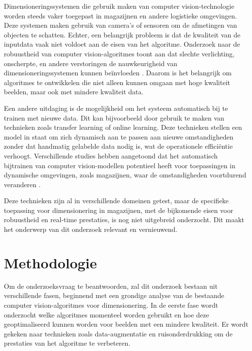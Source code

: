 Dimensioneringssystemen die gebruik maken van computer vision-technologie worden steeds vaker toegepast in magazijnen en andere logistieke omgevingen. Deze systemen maken gebruik van camera’s of sensoren om de afmetingen van objecten te schatten. \autocite{getcameras2024} Echter, een belangrijk probleem is dat de kwaliteit van de inputdata vaak niet voldoet aan de eisen van het algoritme. Onderzoek naar de robuustheid van computer vision-algoritmes toont aan dat slechte verlichting, onscherpte, en andere verstoringen de nauwkeurigheid van dimensioneringssystemen kunnen beïnvloeden \autocite{DeepCorrect2024}. Daarom is het belangrijk om algoritmes te ontwikkelen die niet alleen kunnen omgaan met hoge kwaliteit beelden, maar ook met mindere kwaliteit data.

Een andere uitdaging is de mogelijkheid om het systeem automatisch bij te trainen met nieuwe data. Dit kan bijvoorbeeld door gebruik te maken van technieken zoals transfer learning of online learning. Deze technieken stellen een model in staat om zich dynamisch aan te passen aan nieuwe omstandigheden zonder dat handmatig gelabelde data nodig is, wat de operationele efficiëntie verhoogt. Verschillende studies hebben aangetoond dat het automatisch bijtrainen van computer vision-modellen potentieel heeft voor toepassingen in dynamische omgevingen, zoals magazijnen, waar de omstandigheden voortdurend veranderen \autocite{AdaptLearn2024} \autocite{MDPI2024}.

Deze technieken zijn al in verschillende domeinen getest, maar de specifieke toepassing voor dimensionering in magazijnen, met de bijkomende eisen voor robuustheid en real-time prestaties, is nog niet uitgebreid onderzocht. Dit maakt het onderwerp van dit onderzoek relevant en vernieuwend.


\section{Methodologie}
\label{sec:methodologie}

Om de onderzoeksvraag te beantwoorden, zal dit onderzoek bestaan uit verschillende fasen, beginnend met een grondige analyse van de bestaande computer vision-algoritmes voor dimensionering. In de eerste fase wordt onderzocht welke algoritmes momenteel worden gebruikt en hoe deze geoptimaliseerd kunnen worden voor beelden met een mindere kwaliteit. Er wordt gekeken naar technieken zoals data-augmentatie en ruisonderdrukking om de prestaties van het algoritme te verbeteren.

